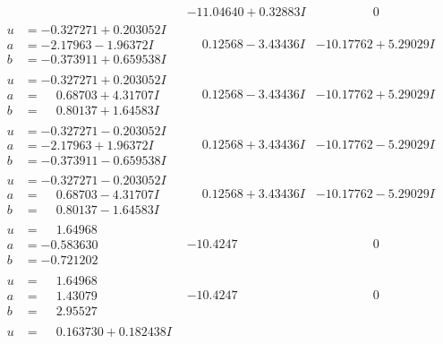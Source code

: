 \documentclass[1p]{elsarticle_modified}
\theoremstyle{definition}
\begin{document}
$$\begin{array}{c|c|c}
 & -11.04640 + 0.32883 I & \phantom{-0.000000 } 0 \\ \hline\begin{aligned}
u &= -0.327271 + 0.203052 I \\
a &= -2.17963 - 1.96372 I \\
b &= -0.373911 + 0.659538 I\end{aligned}
 & \phantom{-}0.12568 - 3.43436 I & -10.17762 + 5.29029 I \\ \hline\begin{aligned}
u &= -0.327271 + 0.203052 I \\
a &= \phantom{-}0.68703 + 4.31707 I \\
b &= \phantom{-}0.80137 + 1.64583 I\end{aligned}
 & \phantom{-}0.12568 - 3.43436 I & -10.17762 + 5.29029 I \\ \hline\begin{aligned}
u &= -0.327271 - 0.203052 I \\
a &= -2.17963 + 1.96372 I \\
b &= -0.373911 - 0.659538 I\end{aligned}
 & \phantom{-}0.12568 + 3.43436 I & -10.17762 - 5.29029 I \\ \hline\begin{aligned}
u &= -0.327271 - 0.203052 I \\
a &= \phantom{-}0.68703 - 4.31707 I \\
b &= \phantom{-}0.80137 - 1.64583 I\end{aligned}
 & \phantom{-}0.12568 + 3.43436 I & -10.17762 - 5.29029 I \\ \hline\begin{aligned}
u &= \phantom{-}1.64968\phantom{ +0.000000I} \\
a &= -0.583630\phantom{ +0.000000I} \\
b &= -0.721202\phantom{ +0.000000I}\end{aligned}
 & -10.4247\phantom{ +0.000000I} & \phantom{-0.000000 } 0 \\ \hline\begin{aligned}
u &= \phantom{-}1.64968\phantom{ +0.000000I} \\
a &= \phantom{-}1.43079\phantom{ +0.000000I} \\
b &= \phantom{-}2.95527\phantom{ +0.000000I}\end{aligned}
 & -10.4247\phantom{ +0.000000I} & \phantom{-0.000000 } 0 \\ \hline\begin{aligned}
u &= \phantom{-}0.163730 + 0.182438 I \\

\end{aligned}
\end{array}$$
\end{document}
